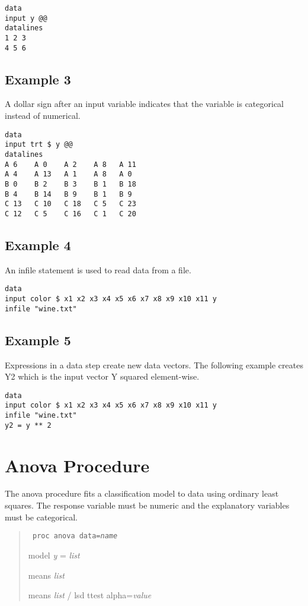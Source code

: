 \documentclass[11pt]{article}
\begin{document}
\begin{Verbatim}
data
input y @@
datalines
1 2 3
4 5 6
\end{Verbatim}

\subsection*{Example 3}
A dollar sign after an input variable indicates that the variable
is categorical instead of numerical.

\begin{Verbatim}
data
input trt $ y @@
datalines
A 6    A 0    A 2    A 8   A 11
A 4    A 13   A 1    A 8   A 0
B 0    B 2    B 3    B 1   B 18
B 4    B 14   B 9    B 1   B 9
C 13   C 10   C 18   C 5   C 23
C 12   C 5    C 16   C 1   C 20
\end{Verbatim}

\subsection*{Example 4}
An infile statement is used to read data from a file.

\begin{Verbatim}
data
input color $ x1 x2 x3 x4 x5 x6 x7 x8 x9 x10 x11 y
infile "wine.txt"
\end{Verbatim}

\subsection*{Example 5}
Expressions in a data step create new data vectors.
The following example creates Y2 which is the input
vector Y squared element-wise.

\begin{Verbatim}
data
input color $ x1 x2 x3 x4 x5 x6 x7 x8 x9 x10 x11 y
infile "wine.txt"
y2 = y ** 2
\end{Verbatim}

\newpage

\section{Anova Procedure}
The anova procedure fits a classification model
to data using ordinary least squares.
The response variable must be numeric and the
explanatory variables must be categorical.

\begin{quote}
{\tt
proc anova data={\it name}

model {\it y} = {\it list}

means {\it list}

means {\it list} / lsd ttest alpha={\it value}
}
\end{quote}
\end{document}
